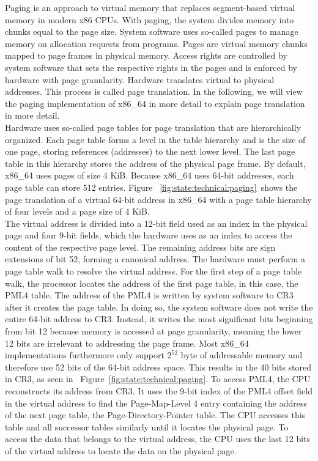 Paging is an approach to virtual memory that replaces segment-based virtual
memory in modern x86 CPUs. With paging, the system divides memory into chunks
equal to the page size. System software uses so-called pages to manage memory on
allocation requests from programs. Pages are virtual memory chunks mapped to
page frames in physical memory. Access rights are controlled by system software
that sets the respective rights in the pages and is enforced by hardware with
page granularity. Hardware translates virtual to physical addresses. This
process is called page translation. In the following, we will view the paging
implementation of x86\_64 in more detail to explain page translation in more
detail.\\

Hardware uses so-called page tables for page translation that are hierarchically
organized. Each page table forms a level in the table hierarchy and is the size
of one page, storing references (addresses) to the next lower level. The last
page table in this hierarchy stores the address of the physical page frame. By
default, x86\_64 uses pages of size 4 KiB. Because x86\_64 uses 64-bit
addresses, each page table can store 512 entries. Figure
~\ref{fig:state:technical:paging}~shows the page translation of a virtual 64-bit
address in x86\_64 with a page table hierarchy of four levels and a page size of
4 KiB. \\

The virtual address is divided into a 12-bit field used as an index in the
physical page and four 9-bit fields, which the hardware uses as an index to
access the content of the respective page level. The remaining address bits are
sign extensions of bit 52, forming a canonical address. The hardware must
perform a page table walk to resolve the virtual address. For the first step of
a page table walk, the processor locates the address of the first page table, in
this case, the PML4 table. The address of the PML4 is written by system software
to CR3 after it creates the page table. In doing so, the system software does
not write the entire 64-bit address to CR3. Instead, it writes the most
significant bits beginning from bit 12 because memory is accessed at page
granularity, meaning the lower 12 bits are irrelevant to addressing the page
frame. Most x86\_64 implementations furthermore only support $2^{52}$ byte of
addressable memory and therefore use 52 bits of the 64-bit address space. This
results in the 40 bits stored in CR3, as seen in
~Figure~\ref{fig:state:technical:paging}. To access PML4, the CPU reconstructs
its address from CR3. It uses the 9-bit index of the PML4 offset field in the
virtual address to find the Page-Map-Level 4 entry containing the address of the
next page table, the Page-Directory-Pointer table. The CPU accesses this table
and all successor tables similarly until it locates the physical page. To access
the data that belongs to the virtual address, the CPU uses the last 12 bits of
the virtual address to locate the data on the physical page. \\

